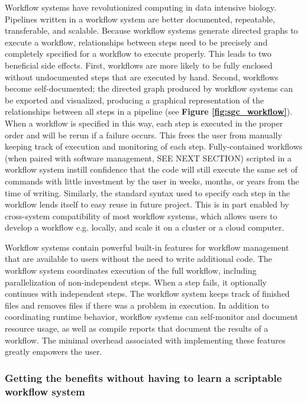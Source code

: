 \documentclass[10pt,letterpaper]{article}
\begin{document}
Workflow systems have revolutionized computing in data intensive biology.
Pipelines written in a workflow system are better documented, repeatable, transferable, and scalable. 
Because workflow systems generate directed graphs to execute a workflow, relationships between steps need to be precisely and completely specified for a workflow to execute properly.
This leads to two beneficial side effects. 
First, workflows are more likely to be fully enclosed without undocumented steps that are executed by hand. 
Second, workflows become self-documented; the directed graph produced by workflow systems can be exported and visualized, producing a graphical representation of the relationships between all steps in a pipeline (see \textbf{Figure \ref{fig:sgc_workflow}}).
When a workflow is specified in this way, each step is executed in the proper order and will be rerun if a failure occurs. 
This frees the user from manually keeping track of execution and monitoring of each step.
Fully-contained workflows (when paired with software management, SEE NEXT SECTION) scripted in a workflow system instill confidence that the code will still execute the same set of commands with little investment by the user in weeks, months, or years from the time of writing.
Similarly, the standard syntax used to specify each step in the workflow lends itself to easy reuse in future project. 
This is in part enabled by cross-system compatibility of most workflow systems, which allows users to develop a workflow e.g. locally, and scale it on a cluster or a cloud computer.

Workflow systems contain powerful built-in features for workflow management that are available to users without the need to write additional code.
The workflow system coordinates execution of the full workflow, including parallelization of non-independent steps. 
When a step fails, it optionally continues with independent steps.
The workflow system keeps track of finished files and removes files if there was a problem in execution.
In addition to coordinating runtime behavior, workflow systems can self-monitor and document resource usage, as well as compile reports that document the results of a workflow. 
The minimal overhead associated with implementing these features greatly empowers the user.

\subsubsection*{Getting the benefits without having to learn a scriptable workflow system}
\end{document}

